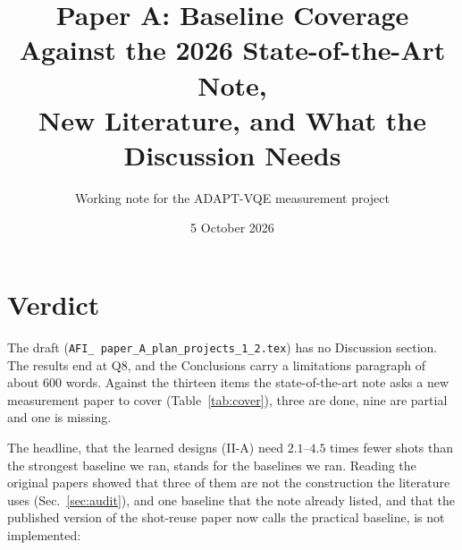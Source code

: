 \documentclass[11pt]{article}
\title{Paper A: Baseline Coverage Against the 2026 State-of-the-Art Note,\\New Literature, and What the Discussion Needs}
\author{Working note for the ADAPT-VQE measurement project}
\date{5 October 2026}
\begin{document}
\maketitle

\section{Verdict}

The draft (\texttt{AFI\_ paper\_A\_plan\_projects\_1\_2.tex}) has no Discussion section. The results end at Q8, and the Conclusions carry a limitations paragraph of about 600 words. Against the thirteen items the state-of-the-art note asks a new measurement paper to cover (Table~\ref{tab:cover}), three are done, nine are partial and one is missing.

The headline, that the learned designs (II-A) need $2.1$--$4.5$ times fewer shots than the strongest baseline we ran, stands for the baselines we ran. Reading the original papers showed that three of them are not the construction the literature uses (Sec.~\ref{sec:audit}), and one baseline that the note already listed, and that the published version of the shot-reuse paper now calls the practical baseline, is not implemented:
\end{document}
